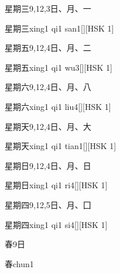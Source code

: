 \begin{Entry}{星期三}{9,12,3}{⽇、⽉、⼀}
  \begin{Phonetics}{星期三}{xing1 qi1 san1}[][HSK 1]
  \end{Phonetics}
\end{Entry}

\begin{Entry}{星期五}{9,12,4}{⽇、⽉、⼆}
  \begin{Phonetics}{星期五}{xing1 qi1 wu3}[][HSK 1]
  \end{Phonetics}
\end{Entry}

\begin{Entry}{星期六}{9,12,4}{⽇、⽉、⼋}
  \begin{Phonetics}{星期六}{xing1 qi1 liu4}[][HSK 1]
  \end{Phonetics}
\end{Entry}

\begin{Entry}{星期天}{9,12,4}{⽇、⽉、⼤}
  \begin{Phonetics}{星期天}{xing1 qi1 tian1}[][HSK 1]
  \end{Phonetics}
\end{Entry}

\begin{Entry}{星期日}{9,12,4}{⽇、⽉、⽇}
  \begin{Phonetics}{星期日}{xing1 qi1 ri4}[][HSK 1]
  \end{Phonetics}
\end{Entry}

\begin{Entry}{星期四}{9,12,5}{⽇、⽉、⼞}
  \begin{Phonetics}{星期四}{xing1 qi1 si4}[][HSK 1]
  \end{Phonetics}
\end{Entry}

\begin{Entry}{春}{9}{⽇}
  \begin{Phonetics}{春}{chun1}
  \end{Phonetics}
\end{Entry}

